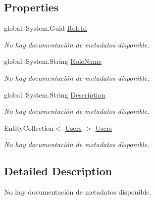 \subsection*{Properties}
\begin{DoxyCompactItemize}
\item 
global\-::\-System.\-Guid \hyperlink{class_game_memory_1_1_roles_a5bd242a9360210f533b781b88f8048e2}{Role\-Id}
\begin{DoxyCompactList}\small\item\em No hay documentación de metadatos disponible. \end{DoxyCompactList}\item 
global\-::\-System.\-String \hyperlink{class_game_memory_1_1_roles_a0bb55986f20f2f4d2356cefc63638d16}{Role\-Name}
\begin{DoxyCompactList}\small\item\em No hay documentación de metadatos disponible. \end{DoxyCompactList}\item 
global\-::\-System.\-String \hyperlink{class_game_memory_1_1_roles_a57a000be4763931423003c4d9a473567}{Description}
\begin{DoxyCompactList}\small\item\em No hay documentación de metadatos disponible. \end{DoxyCompactList}\item 
Entity\-Collection$<$ \hyperlink{class_game_memory_1_1_users}{Users} $>$ \hyperlink{class_game_memory_1_1_roles_ad0095e11f320d6670960cfdf46f4c01c}{Users}
\begin{DoxyCompactList}\small\item\em No hay documentación de metadatos disponible. \end{DoxyCompactList}\end{DoxyCompactItemize}


\subsection{Detailed Description}
No hay documentación de metadatos disponible. 



